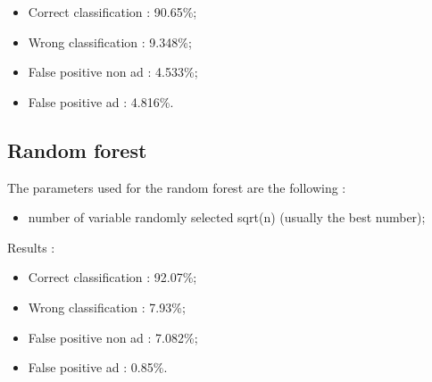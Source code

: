   \begin{itemize}
    \item Correct classification : 90.65\%;
    \item Wrong classification : 9.348\%;
    \item False positive non ad : 4.533\%;
    \item False positive ad : 4.816\%.
  \end{itemize}


\subsection{Random forest}
The parameters used for the random forest are the following :
  \begin{itemize}
    \item number of variable randomly selected sqrt(n) (usually the best number);
  \end{itemize}
Results :
\begin{itemize}
  \item Correct classification : 92.07\%;
  \item Wrong classification : 7.93\%;
  \item False positive non ad : 7.082\%;
  \item False positive ad : 0.85\%.
\end{itemize}
